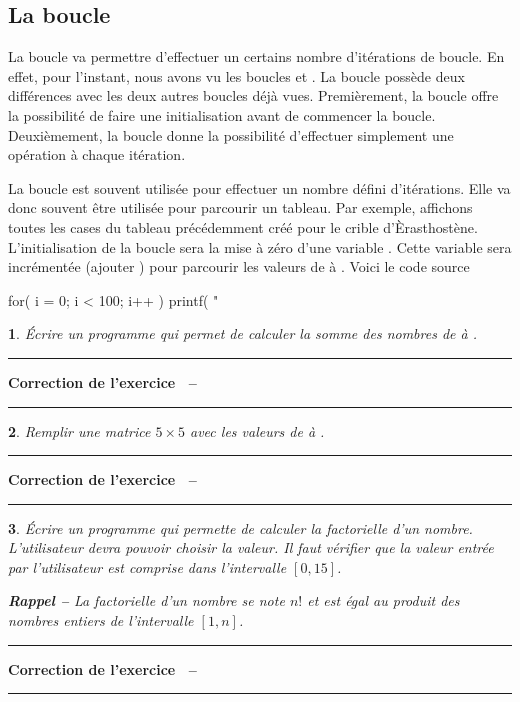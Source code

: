 \documentclass[a4paper]{article}
\newenvironment{Correction}{\par\tiny\blue\rule[1ex]{\textwidth}{1pt}\par\normalsize\textbf{\sffamily{}Correction de l'exercice~\theExo{} -- }}{\par\tiny\blue\rule[1ex]{\textwidth}{1pt}\par}
\newtheorem{Exo}{{\sffamily{Exercice}}}
\begin{document}
		\subsection{La boucle }
			La boucle  va permettre d'effectuer un certains nombre d'itérations de boucle.
			En effet, pour l'instant, nous avons vu les boucles  et .
			La boucle  possède deux différences avec les deux autres boucles déjà vues.
			Premièrement, la boucle  offre la possibilité de faire une initialisation avant de commencer la boucle.
			Deuxièmement, la boucle  donne la possibilité d'effectuer simplement une opération à chaque itération.

			La boucle  est souvent utilisée pour effectuer un nombre défini d'itérations.
			Elle va donc souvent être utilisée pour parcourir un tableau.
			Par exemple, affichons toutes les cases du tableau précédemment créé pour le crible d'Èrasthostène.
			L'initialisation de la boucle  sera la mise à zéro d'une variable .
			Cette variable  sera incrémentée (ajouter ) pour parcourir les valeurs de  à .
			Voici le code source
			\begin{Code*}
for( i = 0; i < 100; i++ )
{
	printf( "%
}
			\end{Code*}
			
			\begin{Exo}
				Écrire un programme qui permet de calculer la somme des nombres de  à .
			\end{Exo}
			\begin{Correction}
			\end{Correction}
			\begin{Exo}
				Remplir une matrice $5\times 5$ avec les valeurs de  à .
			\end{Exo}
			\begin{Correction}
			\end{Correction}
			\begin{Exo}
				Écrire un programme qui permette de calculer la factorielle d'un nombre.
				L'utilisateur devra pouvoir choisir la valeur.
				Il faut vérifier que la valeur entrée par l'utilisateur est comprise dans l'intervalle $[0,15]$.
				
				\textbf{Rappel --} La factorielle d'un nombre se note $n!$ et est égal au produit des nombres entiers de l'intervalle $[1,n]$.
			\end{Exo}
			\begin{Correction}
			\end{Correction}
\end{document}
